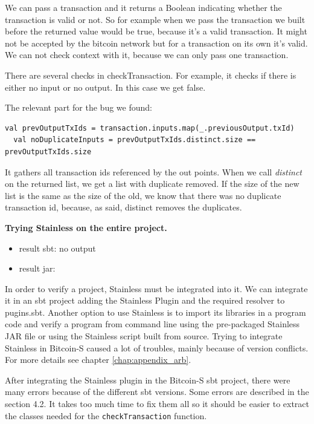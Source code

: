 \documentclass[runningheads]{llncs}
\renewcommand{\paragraph}{\textbf}%
\begin{document}
We can pass a transaction and it returns a Boolean indicating whether
the transaction is valid or not.  So for example when we pass the
transaction we built before the returned value would be true, because
it's a valid transaction.  It might not be accepted by the bitcoin
network but for a transaction on its own it's valid.  We can not check
context with it, because we can only pass one transaction.

There are several checks in checkTransaction.
For example, it checks if there is either no input or no output.
In this case we get false.

The relevant part for the bug we found:
\begin{lstlisting}[style=scala]
  val prevOutputTxIds = transaction.inputs.map(_.previousOutput.txId)
  val noDuplicateInputs = prevOutputTxIds.distinct.size == prevOutputTxIds.size
\end{lstlisting}

It gathers all transaction ids referenced by the out points.  When we
call \emph{distinct} on the returned list, we get a list with
duplicate removed.  If the size of the new list is the same as the
size of the old, we know that there was no duplicate transaction id,
because, as said, distinct removes the duplicates.




\paragraph{Trying Stainless on the entire project.}

\begin{itemize}
\item result sbt: no output
\item result jar: 
\end{itemize}

In order to verify a project, Stainless must be integrated into it.
We can integrate it in an sbt project adding the Stainless Plugin 
and the required resolver to pugins.sbt. 
Another option to use Stainless is to import its libraries in a program code 
and verify a program from command line using the pre-packaged Stainless JAR file 
or using the Stainless script built from source.
Trying to integrate Stainless in Bitcoin-S caused a lot of troubles,
mainly because of version conflicts.  For more details see chapter
\ref{chap:appendix_arb}.


After integrating the Stainless plugin in the Bitcoin-S sbt project, 
there were many errors because of the different sbt versions.  
Some errors are described in the section 4.2.
It takes too much time to fix them all so it should be easier to extract
the classes needed for the \texttt{checkTransaction} function.
\end{document}
